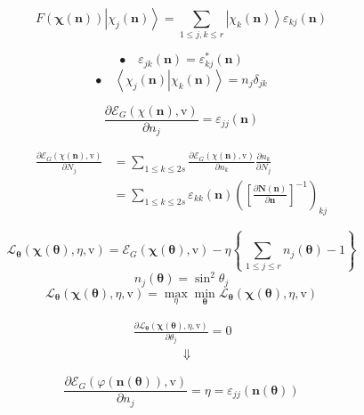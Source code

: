 \documentclass[aps,preprint]{revtex4}%
\begin{document}
\[
F\left(  \mathbf{\chi}\left(  \mathbf{n}\right)  \right)  \left\vert \chi
_{j}\left(  \mathbf{n}\right)  \right\rangle =\sum_{1\leq j,k\leq r}\left\vert
\chi_{k}\left(  \mathbf{n}\right)  \right\rangle \varepsilon_{kj}\left(
\mathbf{n}\right)
\]
%

\[
\bullet\quad\varepsilon_{jk}\left(  \mathbf{n}\right)  =\varepsilon_{kj}%
^{\ast}\left(  \mathbf{n}\right)
\]%
\[
\bullet\quad\left\langle \left.  \chi_{j}\left(  \mathbf{n}\right)
\right\vert \chi_{k}\left(  \mathbf{n}\right)  \right\rangle =n_{j}\delta_{jk}%
\]
%

\[
\frac{\partial\mathcal{E}_{G}\left(  \chi\mathbf{\left(  \mathbf{n}\right)
},\mathrm{v}\right)  }{\partial n_{j}}=\varepsilon_{jj}\left(  \mathbf{n}%
\right)
\]
%

\begin{align*}
\frac{\partial\mathcal{E}_{G}\left(  \chi\mathbf{\left(  \mathbf{n}\right)
},\mathrm{v}\right)  }{\partial N_{j}}  &  =\sum_{1\leq k\leq2s}\frac
{\partial\mathcal{E}_{G}\left(  \chi\mathbf{\left(  \mathbf{n}\right)
},\mathrm{v}\right)  }{\partial n_{k}}\frac{\partial n_{k}}{\partial N_{j}}\\
&  =\sum_{1\leq k\leq2s}\varepsilon_{kk}\left(  \mathbf{n}\right)  \left(
\left[  \frac{\partial\mathbf{N}\left(  \mathbf{n}\right)  }{\partial
\mathbf{n}}\right]  ^{-1}\right)  _{kj}%
\end{align*}
%

\[
\mathcal{L}_{\mathbf{\theta}}\left(  \mathbf{\chi}\left(  \mathbf{\theta
}\right)  ,\eta,\mathrm{v}\right)  =\mathcal{E}_{G}\left(  \mathbf{\chi
}\left(  \mathbf{\theta}\right)  \mathbf{,}\mathrm{v}\right)  -\eta\left\{
\sum_{\,1\leq j\leq r}n_{j}\left(  \mathbf{\theta}\right)  -1\right\}
\]%
\[
n_{j}\left(  \mathbf{\theta}\right)  =\sin^{2}\theta_{j}%
\]%
\[
\mathcal{L}_{\mathbf{\theta}}\left(  \mathbf{\chi}\left(  \mathbf{\theta
}\right)  ,\eta,\mathrm{v}\right)  =\max_{\eta}\min_{\mathbf{\theta}%
}\mathcal{L}_{\mathbf{\theta}}\left(  \mathbf{\chi}\left(  \mathbf{\theta
}\right)  ,\eta,\mathrm{v}\right)
\]
%

\begin{align*}
&  \frac{\partial\mathcal{L}_{\mathbf{\theta}}\left(  \mathbf{\chi}\left(
\mathbf{\theta}\right)  ,\eta\mathbf{,}\mathrm{v}\right)  }{\partial\theta
_{j}}=0\text{ }\\
&  \qquad\qquad\left.  \Downarrow\right.
\end{align*}
%

\[
\frac{\partial\mathcal{E}_{G}\left(  \varphi\left(  \mathbf{n}\left(
\mathbf{\theta}\right)  \right)  ,\mathrm{v}\right)  }{\partial n_{j}}%
=\eta=\varepsilon_{jj}\left(  \mathbf{\mathbf{n}}\left(  \mathbf{\theta
}\right)  \right)
\]
%
\end{document}
